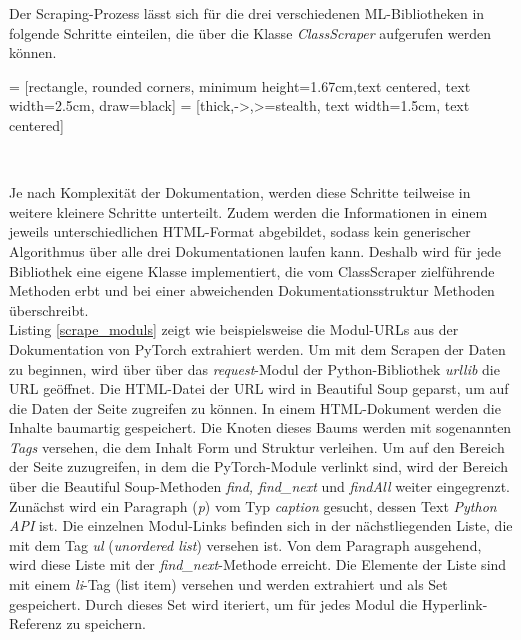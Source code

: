 \documentclass[german,bachelor]{swsLeipzig}
\begin{document}
Der Scraping-Prozess lässt sich für die drei verschiedenen ML-Bibliotheken in folgende Schritte einteilen, die über die Klasse
\textit{ClassScraper} aufgerufen werden können.

 = [rectangle, rounded corners, minimum height=1.67cm,text centered, text width=2.5cm, draw=black]
 = [thick,->,>=stealth, text width=1.5cm, text centered]

\begin{center}
\end{center}
\

Je nach Komplexität der Dokumentation, werden diese Schritte teilweise in weitere kleinere Schritte unterteilt.
Zudem werden die Informationen in einem jeweils unterschiedlichen HTML-Format abgebildet,
sodass kein generischer Algorithmus über alle drei Dokumentationen laufen kann.
Deshalb wird für jede Bibliothek eine eigene Klasse implementiert, die vom ClassScraper zielführende Methoden erbt und
bei einer abweichenden Dokumentationsstruktur Methoden überschreibt. \\

Listing \ref{scrape_moduls} zeigt wie beispielsweise die Modul-URLs aus der Dokumentation von PyTorch extrahiert werden.
Um mit dem Scrapen der Daten zu beginnen, wird über über das \textit{request}-Modul der Python-Bibliothek \textit{urllib} die URL geöffnet.
Die HTML-Datei der URL wird in Beautiful Soup geparst, um auf die Daten der Seite zugreifen zu können.
In einem HTML-Dokument werden die Inhalte baumartig gespeichert.
Die Knoten dieses Baums werden mit sogenannten \textit{Tags} versehen, die dem Inhalt Form und Struktur verleihen.
Um auf den Bereich der Seite zuzugreifen, in dem die PyTorch-Module verlinkt sind, wird der Bereich über die Beautiful Soup-Methoden
\textit{find, find\_next} und \textit{findAll} weiter eingegrenzt.
Zunächst wird ein Paragraph (\textit{p}) vom Typ \textit{caption} gesucht, dessen Text \textit{Python API} ist.
Die einzelnen Modul-Links befinden sich in der nächstliegenden Liste, die mit dem Tag \textit{ul} (\textit{unordered list})
versehen ist.
Von dem Paragraph ausgehend, wird diese Liste mit der \textit{find\_next}-Methode erreicht.
Die Elemente der Liste sind mit einem \textit{li}-Tag (list item) versehen und werden extrahiert und als Set gespeichert.
Durch dieses Set wird iteriert, um für jedes Modul die Hyperlink-Referenz zu speichern.\\
\end{document}
